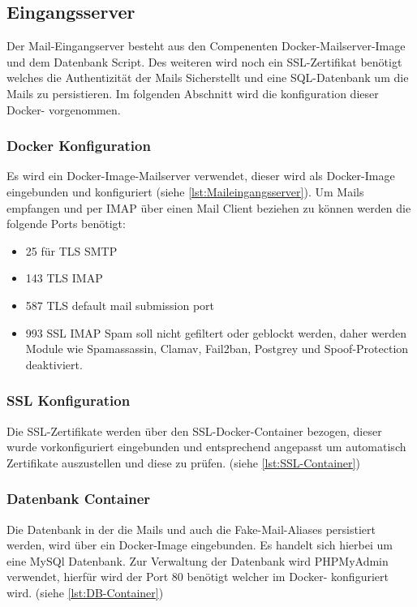 \documentclass[a4paper,11pt,singlespacing]{article}
\begin{document}
	\subsection{Eingangsserver}\label{sec:UmsetzungEingangsserver}
		Der Mail-Eingangserver besteht aus den Compenenten Docker-Mailserver-Image und dem Datenbank Script. Des weiteren wird noch ein SSL-Zertifikat benötigt welches die Authentizität der Mails Sicherstellt und eine SQL-Datenbank um die Mails zu persistieren. Im folgenden Abschnitt wird die konfiguration dieser Docker- vorgenommen.
		\subsubsection{Docker Konfiguration}\label{Mail-In-Container}
			Es wird ein Docker-Image-Mailserver verwendet, dieser wird als Docker-Image eingebunden und konfiguriert (siehe \autoref{lst:Maileingangsserver}). Um Mails empfangen und per IMAP über einen Mail Client beziehen zu können werden die folgende Ports benötigt:
		\begin{itemize}
			\item
				25 für TLS SMTP
			\item
				143 TLS IMAP
			\item
				587 TLS default mail submission port
			\item
				993 SSL IMAP
			Spam soll nicht gefiltert oder geblockt werden, daher werden Module wie Spamassassin, Clamav, Fail2ban, Postgrey und Spoof-Protection deaktiviert.
		\end{itemize}
			
		\subsubsection{SSL Konfiguration}\label{SSl-Container}
			Die SSL-Zertifikate werden über den SSL-Docker-Container bezogen, dieser wurde vorkonfiguriert eingebunden und entsprechend angepasst um automatisch Zertifikate auszustellen und diese zu prüfen. (siehe \autoref{lst:SSL-Container})

		\subsubsection{Datenbank Container}\label{DB-Container}
			Die Datenbank in der die Mails und auch die Fake-Mail-Aliases persistiert werden, wird über ein Docker-Image eingebunden. Es handelt sich hierbei um eine MySQl Datenbank. Zur Verwaltung der Datenbank wird PHPMyAdmin verwendet, hierfür wird der Port 80 benötigt welcher im Docker- konfiguriert wird. (siehe \autoref{lst:DB-Container})
\end{document}
